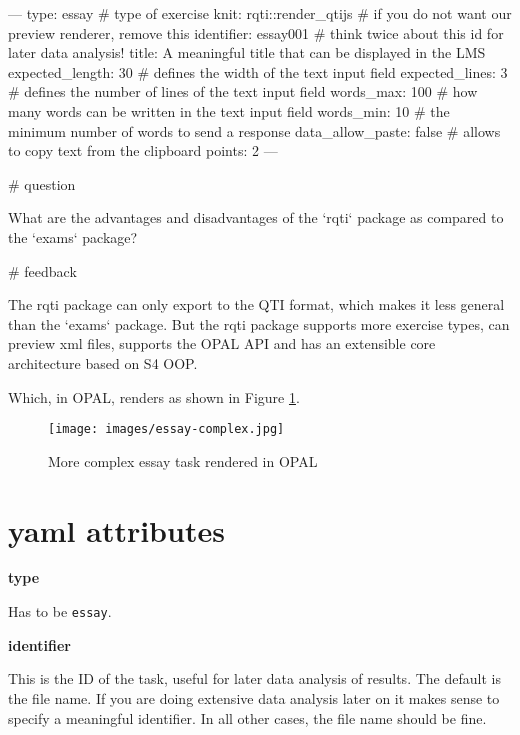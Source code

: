 \documentclass[twoside]{tufte-book}
\newenvironment{Shaded}{}{}
\begin{document}
\begin{Shaded}
\begin{Highlighting}
---
type: essay # type of exercise
knit: rqti::render_qtijs # if you do not want our preview renderer, remove this
identifier: essay001 # think twice about this id for later data analysis!
title: A meaningful title that can be displayed in the LMS
expected_length: 30 # defines the width of the text input field
expected_lines: 3 # defines the number of lines of the text input field
words_max: 100 # how many words can be written in the text input field
words_min: 10 # the minimum number of words to send a response
data_allow_paste: false # allows to copy text from the clipboard
points: 2
---

# question

What are the advantages and disadvantages of the `rqti` package as compared to
the `exams` package?

# feedback

The rqti package can only export to the QTI format, which makes it less general
than the `exams` package. But the rqti package supports more exercise types, can
preview xml files, supports the OPAL API and has an extensible core architecture
based on S4 OOP.
\end{Highlighting}
\end{Shaded}

Which, in OPAL, renders as shown in Figure \ref{essay2opal}.

\begin{figure}
\centering
\texttt{[image: images/essay-complex.jpg]}
\caption{\label{essay2opal}More complex essay task rendered in OPAL}
\end{figure}

\section{yaml attributes}\label{yaml-attributes-4}

\noindent\textbf{type}\label{type-4}

Has to be \texttt{essay}.

\noindent\textbf{identifier}\label{identifier-4}

This is the ID of the task, useful for later data analysis of results. The default is the file name. If you are doing extensive data analysis later on it makes sense to specify a meaningful identifier. In all other cases, the file name should be fine.
\end{document}
